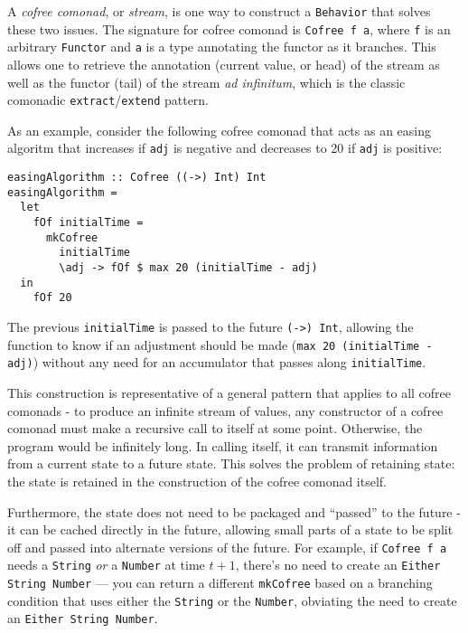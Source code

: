 \documentclass{sig-alternate}
\begin{document}
\begin{sloppypar}
  A \textit{cofree comonad}, or \textit{stream}, is one way to construct a \texttt{Behavior} that solves these two issues. The signature for cofree comonad is \verb=Cofree f a=, where \texttt{f} is an arbitrary \texttt{Functor} and \texttt{a} is a type annotating the functor as it branches. This allows one to retrieve the annotation (current value, or head) of the stream as well as the functor (tail) of the stream \textit{ad infinitum}, which is the classic comonadic \texttt{extract}/\texttt{extend} pattern.

  As an example, consider the following cofree comonad that acts as an easing algoritm that increases if \verb=adj= is negative and decreases to 20 if \verb=adj= is positive:

  \begin{verbatim}
easingAlgorithm :: Cofree ((->) Int) Int
easingAlgorithm =
  let
    fOf initialTime =
      mkCofree
        initialTime
        \adj -> fOf $ max 20 (initialTime - adj)
  in
    fOf 20
  \end{verbatim}

  The previous \texttt{initialTime} is passed to the future \texttt{(->) Int}, allowing the function to know if an adjustment should be made (\texttt{max 20 (initialTime - adj)}) without any need for an accumulator that passes along \texttt{initialTime}.
  
  This construction is representative of a general pattern that applies to all cofree comonads - to produce an infinite stream of values, any constructor of a cofree comonad must make a recursive call to itself at some point. Otherwise, the program would be infinitely long. In calling itself, it can transmit information from a current state to a future state. This solves the problem of retaining state: the state is retained in the construction of the cofree comonad itself. 
  
  Furthermore, the state does not need to be packaged and ``passed'' to the future - it can be cached directly in the future, allowing small parts of a state to be split off and passed into alternate versions of the future.  For example, if \verb=Cofree f a= needs a \verb=String= \textit{or} a \verb=Number= at time $t+1$, there's no need to create an \verb=Either String Number= --- you can return a different \texttt{mkCofree} based on a branching condition that uses either the \verb=String= or the \verb=Number=, obviating the need to create an \verb=Either String Number=.


\end{sloppypar}
\end{document}
